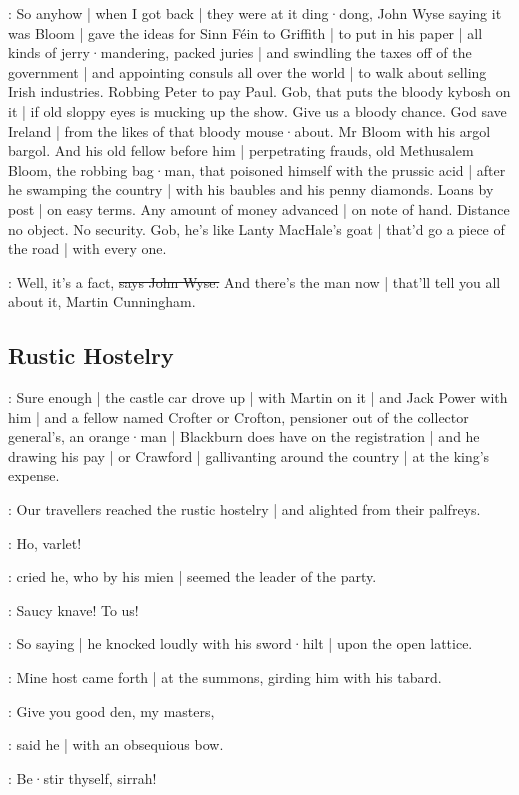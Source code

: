 \Nq:
So anyhow |
when I got back |
they were at it ding·dong,
John Wyse saying it was Bloom |
gave the ideas for Sinn Féin to Griffith |
to put in his paper |
all kinds of jerry·mandering,
packed juries |
and swindling the taxes off of the government |
and appointing consuls all over the world |
to walk about selling Irish industries.
Robbing Peter to pay Paul.
Gob,
that puts the bloody kybosh on it |
if old sloppy eyes is mucking up the show.
Give us a bloody chance.
God save Ireland |
from the likes of that bloody mouse·about.
Mr Bloom with his argol bargol.
And his old fellow before him |
perpetrating frauds,
old Methusalem Bloom,
the robbing bag·man,
that poisoned himself with the prussic acid |
after he swamping the country |
with his baubles and his penny diamonds.
Loans by post |
on easy terms.
Any amount of money advanced |
on note of hand.
Distance no object.
No security.
Gob,
he's like Lanty MacHale's goat |
that'd go a piece of the road |
with every one.

\johnwyse:
Well,
it's a fact,
\sout{says John Wyse.}
And there's the man now |
that'll tell you all about it,
Martin Cunningham.


\subsection*{Rustic Hostelry}

\Nq:
Sure enough |
the castle car drove up |
with Martin on it |
and Jack Power with him |
and a fellow named Crofter or Crofton,
pensioner out of the collector general's,
an orange·man |
Blackburn does have on the registration |
and he drawing his pay |
or Crawford |
gallivanting around the country |
at the king's expense.


:
Our travellers reached the rustic hostelry |
and alighted from their palfreys.

\cunningham:
Ho,
varlet!

:
cried he,
who by his mien |
seemed the leader of the party.

\cunningham:
Saucy knave!
To us!

:
So saying |
he knocked loudly with his sword·hilt |
upon the open lattice.

:
Mine host came forth |
at the summons,
girding him with his tabard.

\terry:
Give you good den,
my masters,

:
said he |
with an obsequious bow.

\cunningham:
Be·stir thyself,
sirrah!

